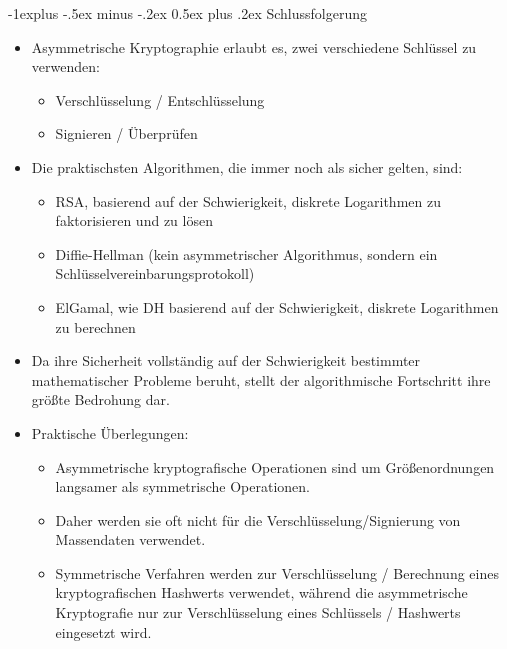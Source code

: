 \documentclass[a4paper]{article}
\makeatletter
\renewcommand{\subsection}{\@startsection{subsection}{2}{0mm}%
 {-1explus -.5ex minus -.2ex}%
 {0.5ex plus .2ex}%
 {\normalfont\normalsize\bfseries}}
\makeatother
\begin{document}
\begin{multicols}{3}
    \subsection{Schlussfolgerung}

    \begin{itemize}
        \item
              Asymmetrische Kryptographie erlaubt es, zwei verschiedene Schlüssel zu
              verwenden:

              \begin{itemize}
                  \item
                        Verschlüsselung / Entschlüsselung
                  \item
                        Signieren / Überprüfen
              \end{itemize}
        \item
              Die praktischsten Algorithmen, die immer noch als sicher gelten, sind:

              \begin{itemize}
                  \item
                        RSA, basierend auf der Schwierigkeit, diskrete Logarithmen zu
                        faktorisieren und zu lösen
                  \item
                        Diffie-Hellman (kein asymmetrischer Algorithmus, sondern ein
                        Schlüsselvereinbarungsprotokoll)
                  \item
                        ElGamal, wie DH basierend auf der Schwierigkeit, diskrete
                        Logarithmen zu berechnen
              \end{itemize}
        \item
              Da ihre Sicherheit vollständig auf der Schwierigkeit bestimmter
              mathematischer Probleme beruht, stellt der algorithmische Fortschritt
              ihre größte Bedrohung dar.
        \item
              Praktische Überlegungen:

              \begin{itemize}
                  \item
                        Asymmetrische kryptografische Operationen sind um Größenordnungen
                        langsamer als symmetrische Operationen.
                  \item
                        Daher werden sie oft nicht für die Verschlüsselung/Signierung von
                        Massendaten verwendet.
                  \item
                        Symmetrische Verfahren werden zur Verschlüsselung / Berechnung eines
                        kryptografischen Hashwerts verwendet, während die asymmetrische
                        Kryptografie nur zur Verschlüsselung eines Schlüssels / Hashwerts
                        eingesetzt wird.
              \end{itemize}
    \end{itemize}



\end{multicols}
\end{document}
